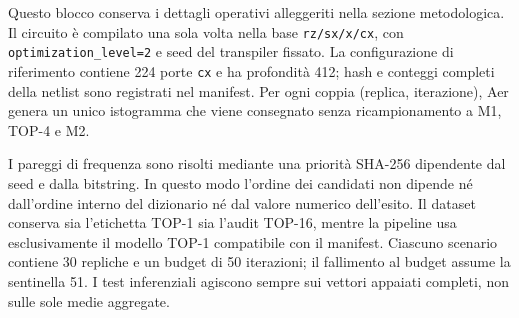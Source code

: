 Questo blocco conserva i dettagli operativi alleggeriti nella sezione
metodologica. Il circuito è compilato una sola volta nella base
\texttt{rz/sx/x/cx}, con \texttt{optimization\_level=2} e seed del transpiler
fissato. La configurazione di riferimento contiene 224 porte \texttt{cx} e ha
profondità 412; hash e conteggi completi della netlist sono registrati nel
manifest. Per ogni coppia (replica, iterazione), Aer genera un unico istogramma
che viene consegnato senza ricampionamento a M1, TOP-4 e M2.

I pareggi di frequenza sono risolti mediante una priorità SHA-256 dipendente
dal seed e dalla bitstring. In questo modo l'ordine dei candidati non dipende
né dall'ordine interno del dizionario né dal valore numerico dell'esito. Il
dataset conserva sia l'etichetta TOP-1 sia l'audit TOP-16, mentre la pipeline
usa esclusivamente il modello TOP-1 compatibile con il manifest. Ciascuno
scenario contiene 30 repliche e un budget di 50 iterazioni; il fallimento al
budget assume la sentinella 51. I test inferenziali agiscono sempre sui vettori
appaiati completi, non sulle sole medie aggregate.
